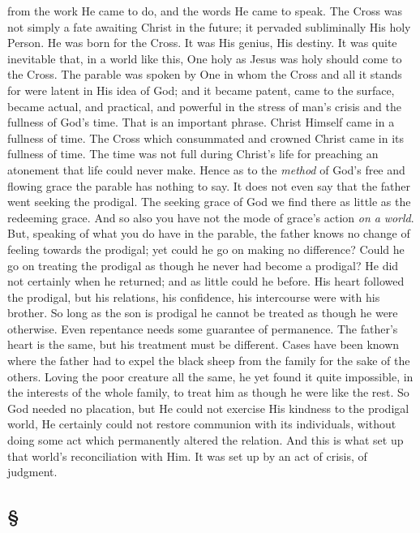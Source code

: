 \documentclass[draft]{ptfdoc}
\begin{document}
from the work He came to do, and the words He 
came to speak. The Cross was not simply a 
fate awaiting Christ in the future; it pervaded 
subliminally His holy Person. He was born for 
the Cross. It was His genius, His destiny. It 
was quite inevitable that, in a world like this, 
One holy as Jesus was holy should come to the 
Cross. The parable was spoken by One in 
whom the Cross and all it stands for were 
latent in His idea of God; and it became 
patent, came to the surface, became actual, 
and practical, and powerful in the stress of 
man's crisis and the fullness of God's time. 
That is an important phrase. Christ Himself 
came in a fullness of time. The Cross which 
consummated and crowned Christ came in its 
fullness of time. The time was not full during 
Christ's life for preaching an atonement that life 
could never make. Hence as to the \textit{method} of 
God's free and flowing grace the parable has 
nothing to say. It does not even say that 
the father went seeking the prodigal. The 
seeking grace of God we find there as little 
as the redeeming grace. And so also you 
have not the mode of grace's action \textit{on a} 
\textit{world}. But, speaking of what you do have in 
the parable, the father knows no change of 
feeling towards the prodigal; yet could he go 
on making no difference? Could he go on 
treating the prodigal as though he never had 
become a prodigal? He did not certainly when 
he returned; and as little could he before. 
His heart followed the prodigal, but his relations, 
his confidence, his intercourse were 
with his brother. So long as the son is prodigal 
he cannot be treated as though he were 
otherwise. Even repentance needs some guarantee 
of permanence. The father's heart is 
the same, but his treatment must be different. 
Cases have been known where the father had 
to expel the black sheep from the family for 
the sake of the others. Loving the poor 
creature all the same, he yet found it quite 
impossible, in the interests of the whole family, 
to treat him as though he were like the rest. 
So God needed no placation, but He could not 
exercise His kindness to the prodigal world, He 
certainly could not restore communion with its 
individuals, without doing some act which permanently 
altered the relation. And this is what 
set up that world's reconciliation with Him. It 
was set up by an act of crisis, of judgment. 

\subsection*{
\S
}
\end{document}
